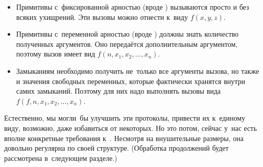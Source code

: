 \begin{itemize}
  \item Примитивы с~фиксированной арностью (вроде )
        вызываются просто и без всяких ухищрений. Эти вызовы можно
        отнести к~виду $f(x, y, z)$.

  \item Примитивы с~переменной арностью (вроде ) должны
        знать количество полученных аргументов. Оно передаётся
        дополнительным аргументом, поэтому вызов имеет вид
        $f(n, x_1, x_2, \dots, x_n)$.

  \item Замыканиям необходимо получить не~только все аргументы вызова,
        но также и значения свободных переменных, которые фактически
        хранятся внутри самих замыканий. Поэтому для них надо выполнять
        вызовы вида $f(f, n, x_1, x_2, \dots, x_n)$.
\end{itemize}

Естественно, мы могли~бы улучшить эти протоколы, привести их к~единому виду,
возможно, даже избавиться от некоторых. Но это потом, сейчас у~нас есть вполне
конкретные требования к~. Несмотря на внушительные размеры,
она довольно регулярна по своей структуре. (Обработка продолжений будет
рассмотрена в~следующем разделе.)

